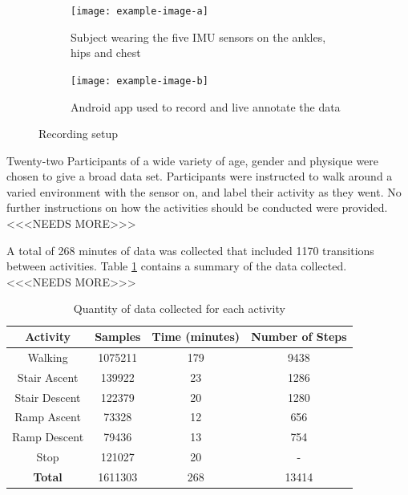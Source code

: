 \documentclass[sensors,article,submit,moreauthors,pdftex]{Definitions/mdpi}
\begin{document}
\begin{figure}[!hbt]
     \begin{subfigure}[b]{0.49\textwidth}
         \centering
         \texttt{[image: example-image-a]}
         \caption{Subject wearing the five IMU sensors on the ankles, hips and chest}
         \label{subfig:movesense_sensors}
     \end{subfigure}
     \hfill
     \begin{subfigure}[b]{0.49\textwidth}
         \centering
         \texttt{[image: example-image-b]}
         \caption{Android app used to record and live annotate the data}
         \label{subfig:android_app}
     \end{subfigure}
    \caption{Recording setup}
    \label{fig:imu_sensors and app}
\end{figure}

Twenty-two Participants of a wide variety of age, gender and physique were chosen to give a broad data set. Participants were instructed to walk around a varied environment with the sensor on, and label their activity as they went. No further instructions on how the activities should be conducted were provided. <<<NEEDS MORE>>>

A total of 268 minutes of data was collected that included 1170 transitions between activities. Table \ref{tab:data_collected_summary} contains a summary of the data collected.<<<NEEDS MORE>>>

\begin{table}[!hbt]
    \centering
    \caption{Quantity of data collected for each activity}
    \label{tab:data_collected_summary}
    \begin{tabular}{cccc}
        \textbf{Activity} & \textbf{Samples} & \textbf{Time (minutes)} & \textbf{Number of Steps} \\
         \hline
         Walking & 1075211 & 179 & 9438 \\
         Stair Ascent & 139922 & 23 & 1286 \\
         Stair Descent & 122379 & 20 & 1280 \\ 
         Ramp Ascent & 73328 & 12 & 656 \\
         Ramp Descent & 79436 & 13 & 754 \\
         Stop & 121027 & 20 & - \\
         \hline
         \textbf{Total} & 1611303 & 268 & 13414
    \end{tabular}
\end{table}
\end{document}
